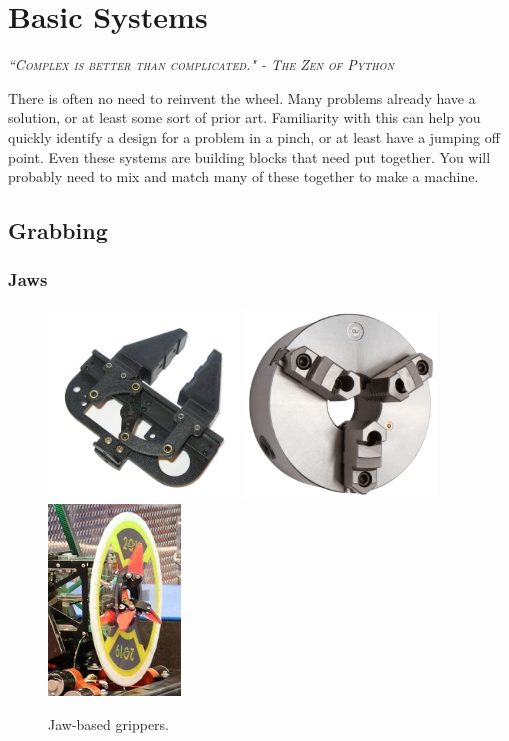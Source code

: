 
\chapter{Basic Systems}

 {\slshape \scshape ``Complex is better than complicated." - The Zen of Python}
 
 There is often no need to reinvent the wheel. Many problems already have a solution, or at least some sort of prior art. Familiarity with this can help you quickly identify a design for a problem in a pinch, or at least have a jumping off point. Even these systems are building blocks that need put together. You will probably need to mix and match many of these together to make a machine.

\section{Grabbing} \label{sec:intakes}

\subsection{Jaws}

\begin{figure}[H]
	\includegraphics[height=2in]{imgs/jaws_claw.jpeg}
	\includegraphics[height=2in]{imgs/jaws_3jawchuck.png}
	\includegraphics[height=2in]{imgs/jaws_internal.png}
	\caption{Jaw-based grippers.}
\end{figure}

